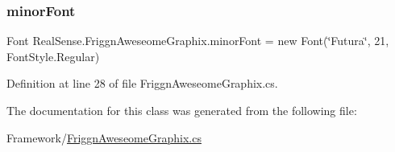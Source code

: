 \subsubsection{\texorpdfstring{minor\+Font}{minorFont}}
{\footnotesize\ttfamily Font Real\+Sense.\+Friggn\+Aweseome\+Graphix.\+minor\+Font = new Font(\char`\"{}Futura\char`\"{}, 21, Font\+Style.\+Regular)\hspace{0.3cm}{\ttfamily [static]}}



Definition at line 28 of file Friggn\+Aweseome\+Graphix.\+cs.



The documentation for this class was generated from the following file\+:\begin{DoxyCompactItemize}
\item 
Framework/\hyperlink{_friggn_aweseome_graphix_8cs}{Friggn\+Aweseome\+Graphix.\+cs}\end{DoxyCompactItemize}
